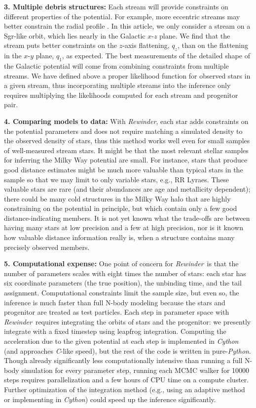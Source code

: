 \documentclass[letterpaper,12pt,preprint]{aastex}
\newcommand{\project}[1]{\textsl{#1}}
\newcommand{\rewinder}{\emph{Rewinder}}
\begin{document}
{\bf 3. Multiple debris structures:} Each stream will provide constraints on different properties of the potential. For example, more eccentric streams may better constrain the radial profile \citep[see][who illustrate the power of using multiple streams to simultaneously constrain the potential using orbit fitting]{deg14}. In this article, we only consider a stream on a Sgr-like orbit, which lies nearly in the Galactic $x$-$z$ plane. We find that the stream puts better constraints on the $z$-axis flattening, $q_z$, than on the flattening in the $x$-$y$ plane, $q_1$, as expected. The best measurements of the detailed shape of the Galactic potential will come from combining constraints from multiple streams. We have defined above a proper likelihood function for observed stars in a given stream, thus incorporating multiple streams into the inference only requires multiplying the likelihoods computed for each stream and progenitor pair.

{\bf 4. Comparing models to data:} With \rewinder, each star adds constraints on the potential parameters and does not require matching a simulated density to the observed density of stars, thus this method works well even for small samples of well-measured stream stars. It might be that the most relevant stellar samples for inferring the Milky Way potential are small. For instance, stars that produce good distance estimates might be much more valuable than typical stars in the sample so that we may limit to only variable stars, e.g., RR Lyraes. These valuable stars are rare (and their abundances are age and metallicity dependent); there could be many cold structures in the Milky Way halo that are highly constraining on the potential in principle, but which contain only a few good distance-indicating members. It is not yet known what the trade-offs are between having many stars at low precision and a few at high precision, nor is it known how valuable distance information really is, when a structure contains many precisely observed members.

{\bf 5. Computational expense:} One point of concern for \rewinder\ is that the number of parameters scales with eight times the number of stars: each star has six coordinate parameters (the true position), the unbinding time, and the tail assignment. Computational constraints limit the sample size, but even so, the inference is much faster than full N-body modeling because the stars and progenitor are treated as test particles. Each step in parameter space with \rewinder\ requires integrating the orbits of stars and the progenitor: we presently integrate with a fixed timestep using leapfrog integration. Computing the acceleration due to the given potential at each step is implemented in \project{Cython} (and approaches \project{C}-like speed), but the rest of the code is written in pure-\project{Python}. Though already significantly less computationally intensive than running a full N-body simulation for every parameter step, running each MCMC walker for 10000 steps requires parallelization and a few hours of CPU time on a compute cluster. Further optimization of the integration method (e.g., using an adaptive method or implementing in \project{Cython}) could speed up the inference significantly. 
\end{document}
